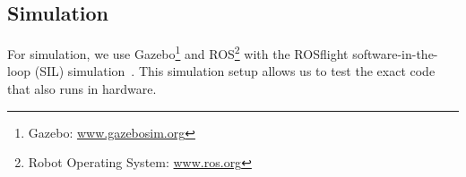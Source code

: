 
\subsection{Simulation}

For simulation, we use Gazebo\footnote{Gazebo:
\href{www.gazebosim.org}{www.gazebosim.org}} and ROS\footnote{Robot Operating System:
\href{www.ros.org}{www.ros.org}} with the ROSflight software-in-the-loop
(SIL) simulation~\cite{jackson2016rosflight}. This simulation setup allows us to test
the exact code that also runs in hardware.


